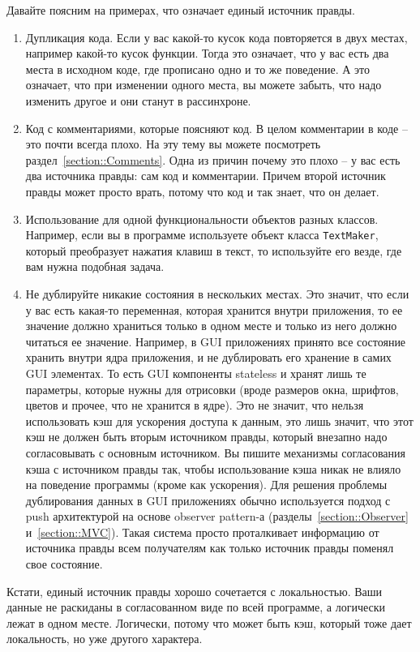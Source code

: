 Давайте поясним на примерах, что означает единый источник правды.
\begin{enumerate}
\item Дупликация кода.
Если у вас какой-то кусок кода повторяется в двух местах, например какой-то кусок функции.
Тогда это означает, что у вас есть два места в исходном коде, где прописано одно и то же поведение.
А это означает, что при изменении одного места, вы можете забыть, что надо изменить другое и они станут в рассинхроне.

\item Код с комментариями, которые поясняют код.
В целом комментарии в коде -- это почти всегда плохо.
На эту тему вы можете посмотреть раздел~\ref{section::Comments}.
Одна из причин почему это плохо -- у вас есть два источника правды: сам код и комментарии.
Причем второй источник правды может просто врать, потому что код и так знает, что он делает.

\item Использование для одной функциональности объектов разных классов.
Например, если вы в программе используете объект класса \verb"TextMaker", который преобразует нажатия клавиш в текст, то используйте его везде, где вам нужна подобная задача.

\item Не дублируйте никакие состояния в нескольких местах.
Это значит, что если у вас есть какая-то переменная, которая хранится внутри приложения, то ее значение должно храниться только в одном месте и только из него должно читаться ее значение.
Например, в GUI приложениях принято все состояние хранить внутри ядра приложения, и не дублировать его хранение в самих GUI элементах.
То есть GUI компоненты stateless и хранят лишь те параметры, которые нужны для отрисовки (вроде размеров окна, шрифтов, цветов и прочее, что не хранится в ядре).
Это не значит, что нельзя использовать кэш для ускорения доступа к данным, это лишь значит, что этот кэш не должен быть вторым источником правды, который внезапно надо согласовывать с основным источником.
Вы пишите механизмы согласования кэша с источником правды так, чтобы использование кэша никак не влияло на поведение программы (кроме как ускорения).
Для решения проблемы дублирования данных в GUI приложениях обычно используется подход с push архитектурой на основе observer pattern-а (разделы~\ref{section::Observer} и~\ref{section::MVC}).
Такая система просто проталкивает информацию от источника правды всем получателям как только источник правды поменял свое состояние.
\end{enumerate}
Кстати, единый источник правды хорошо сочетается с локальностью.
Ваши данные не раскиданы в согласованном виде по всей программе, а логически лежат в одном месте.
Логически, потому что может быть кэш, который тоже дает локальность, но уже другого характера.

